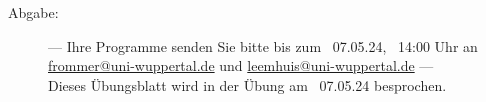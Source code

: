 \documentclass[a4paper,11pt]{scrartcl}
\begin{document}
\begin{description}
\item[Abgabe:] --- Ihre Programme senden Sie bitte bis zum ~07.05.24, ~14:00 Uhr an \href{mailto:frommer@uni-wuppertal.de}{frommer@uni-wuppertal.de} und \href{mailto:leemhuis@uni-wuppertal.de}{leemhuis@uni-wuppertal.de} --- \\
Dieses Übungsblatt wird in der Übung am ~07.05.24 besprochen.


\end{description}
\end{document}
